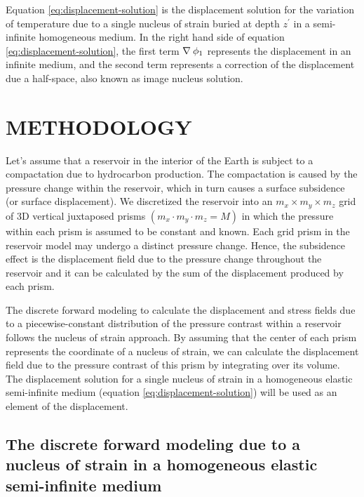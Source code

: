 \documentclass[journal abbreviation, manuscript]{copernicus}
\begin{document}
Equation \ref{eq:displacement-solution} is the displacement solution for the variation of temperature due to a single nucleus of strain buried at depth $z^{\prime}$ in a
semi-infinite homogeneous medium. 
In the right hand side of equation \ref{eq:displacement-solution}, the first term 
$ {\bf{\nabla}} \: \phi_{1} $ represents the displacement in an infinite medium, and the second term represents a correction of the displacement due a half-space, also known as image nucleus solution.

\section{METHODOLOGY}

Let's assume that a reservoir in the interior of the Earth is subject to a compactation due to hydrocarbon production. 
The compactation is caused by the pressure change within the reservoir, which in turn causes  a surface subsidence (or surface displacement). 
We discretized the reservoir into an $ m_{x} \times m_{y} \times m_{z} $ grid of 3D vertical juxtaposed prisms $(m_{x} \cdot m_{y} \cdot m_{z} = M)$ in which
the pressure within each prism is assumed to be constant and known. 
Each grid prism in the reservoir model may undergo a distinct pressure change.
Hence, the subsidence effect is the displacement field due to the pressure change throughout the reservoir and it can be calculated by the sum of the displacement produced by each prism.


The discrete forward modeling to calculate the displacement and stress fields due to a piecewise-constant distribution of the pressure contrast within a reservoir follows the nucleus of strain approach. 
By assuming that the center of each prism represents the coordinate of a nucleus of
strain, we can calculate the displacement field due to the pressure contrast of this prism by integrating over its volume.
The displacement solution for a single nucleus of strain in a homogeneous elastic semi-infinite medium (equation \ref{eq:displacement-solution}) will be used as an element of the displacement.

\subsection{The discrete forward modeling due to a nucleus of strain in a homogeneous elastic semi-infinite medium}\label{solution-nucleus}
\end{document}
